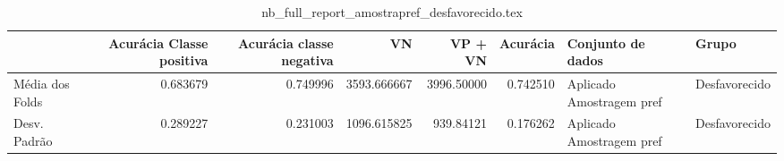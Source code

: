 \begin{table}
\centering
\caption{nb_full_report_amostrapref_desfavorecido.tex}
\label{nb_full_report_amostrapref_desfavorecido.tex}
\begin{tabular}{lrrrrrll}
\toprule
{}              &  Acurácia Classe positiva &  Acurácia classe negativa &          VN  &    VP + VN  &  Acurácia &         Conjunto de dados &          Grupo \\
\midrule
Média dos Folds &                  0.683679 &                  0.749996 &  3593.666667 &  3996.50000 &  0.742510 &  Aplicado Amostragem pref &  Desfavorecido \\
Desv. Padrão    &                  0.289227 &                  0.231003 &  1096.615825 &   939.84121 &  0.176262 &  Aplicado Amostragem pref &  Desfavorecido \\
\bottomrule
\end{tabular}
\end{table}
